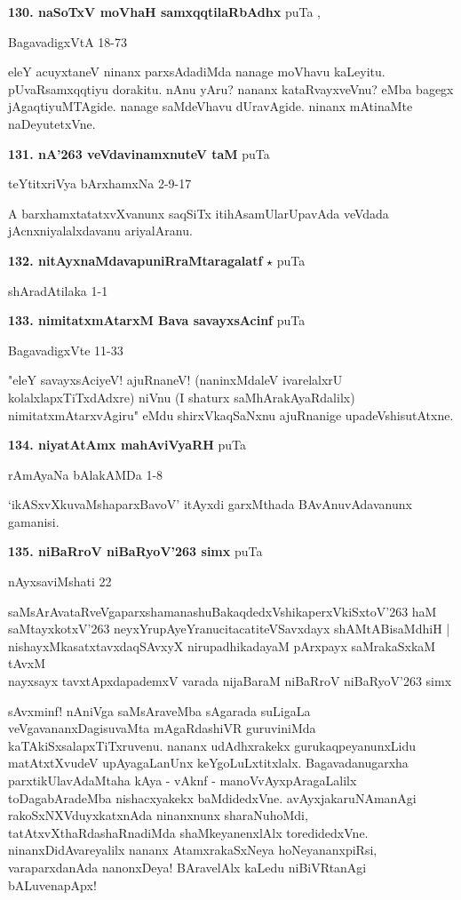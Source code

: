 \medskip
\noindent\textbf{130. naSoTxV moVhaH samxqqtilaRbAdhx} \hfill puTa \pageref{91},\pageref{104}

\hfill BagavadigxVtA 18-73

eleY acuyxtaneV ninanx parxsAdadiMda nanage moVhavu kaLeyitu. pUvaRsamxqqtiyu dorakitu. nAnu yAru? nananx kataRvayxveVnu? eMba bagegx jAgaqtiyuMTAgide. nanage saMdeVhavu dUravAgide. ninanx mAtinaMte naDeyutetxVne.

\medskip
\noindent\textbf{131. nA\char'263 veVdavinamxnuteV taM} \hfill puTa \pageref{106}

\hfill teYtitxriVya bArxhamxNa 2-9-17

A barxhamxtatatxvXvanunx saqSiTx itihAsamUlarUpavAda  veVdada jAcnxniyalalxdavanu ariyalAranu.

\medskip
\noindent\textbf{132. nitAyxnaMdavapuniRraMtaragalatf} $\star$ \hfill puTa \pageref{31}

\hfill shAradAtilaka 1-1

\medskip
\noindent\textbf{133. nimitatxmAtarxM Bava savayxsAcinf} \hfill puTa \pageref{214a}

\hfill BagavadigxVte 11-33

"eleY savayxsAciyeV! ajuRnaneV! (naninxMdaleV ivarelalxrU kolalxlapxTiTxdAdxre) niVnu (I shaturx saMhArakAyaRdalilx) nimitatxmAtarxvAgiru" eMdu shirxVkaqSaNxnu ajuRnanige upadeVshisutAtxne.

\medskip
\noindent\textbf{134. niyatAtAmx mahAviVyaRH} \hfill puTa \pageref{247b}

\hfill rAmAyaNa bAlakAMDa 1-8

`ikASxvXkuvaMshaparxBavoV' itAyxdi garxMthada BAvAnuvAdavanunx gamanisi.

\medskip
\noindent\textbf{135. niBaRroV niBaRyoV\char'263 simx} \hfill puTa \pageref{115}

\hfill nAyxsaviMshati 22

\begin{shloka}
saMsArAvataRveVgaparxshamanashuBakaqdedxVshikaperxVkiSxtoV\char'263 haM\\
saMtayxkotxV\char'263 neyxYrupAyeYranucitacatiteVSavxdayx shAMtABisaMdhiH |\\
nishayxMkasatxtavxdaqSAvxyX nirupadhikadayaM pArxpayx saMrakaSxkaM tAvxM\\
nayxsayx tavxtApxdapademxV varada nijaBaraM niBaRroV niBaRyoV\char'263 simx \\
\end{shloka}

sAvxminf! nAniVga saMsAraveMba sAgarada suLigaLa veVgavananxDagisuvaMta mAgaRdashiVR guruviniMda kaTAkiSxsalapxTiTxruvenu. nananx udAdhxrakekx gurukaqpeyanunxLidu matAtxtXvudeV upAyagaLanUnx keYgoLuLxtitxlalx. Bagavadanugarxha parxtikUlavAdaMtaha kAya - vAknf - manoVvAyxpAragaLalilx toDagabAradeMba nishacxyakekx baMdidedxVne. avAyxjakaruNAmanAgi rakoSxNXVduyxkatxnAda ninanxnunx sharaNuhoMdi, tatAtxvXthaRdashaRnadiMda shaMkeyanenxlAlx toredidedxVne. ninanxDidAvareyalilx nananx AtamxrakaSxNeya hoNeyananxpiRsi, varaparxdanAda nanonxDeya! BAravelAlx kaLedu niBiVRtanAgi bALuvenapApx!

